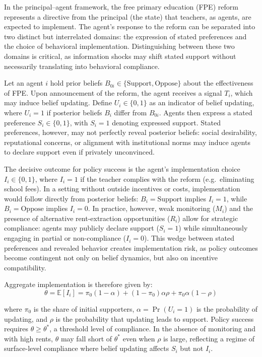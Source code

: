 \documentclass[hidelinks,12pt]{article}
\begin{document}
\begin{singlespace}
In the principal--agent framework, the free primary education (FPE) reform represents a directive from the principal (the state) that teachers, as agents, are expected to implement. The agent’s response to the reform can be separated into two distinct but interrelated domains: the expression of stated preferences and the choice of behavioral implementation. Distinguishing between these two domains is critical, as information shocks may shift stated support without necessarily translating into behavioral compliance.

Let an agent $i$ hold prior beliefs $B_{0i}\in\{\text{Support},\text{Oppose}\}$ about the effectiveness of FPE. Upon announcement of the reform, the agent receives a signal $T_i$, which may induce belief updating. Define $U_i\in\{0,1\}$ as an indicator of belief updating, where $U_i=1$ if posterior beliefs $B_i$ differ from $B_{0i}$. Agents then express a stated preference $S_i\in\{0,1\}$, with $S_i=1$ denoting expressed support. Stated preferences, however, may not perfectly reveal posterior beliefs: social desirability, reputational concerns, or alignment with institutional norms may induce agents to declare support even if privately unconvinced.

The decisive outcome for policy success is the agent’s implementation choice $I_i\in\{0,1\}$, where $I_i=1$ if the teacher complies with the reform (e.g.\ eliminating school fees). In a setting without outside incentives or costs, implementation would follow directly from posterior beliefs: $B_i=\text{Support}$ implies $I_i=1$, while $B_i=\text{Oppose}$ implies $I_i=0$. In practice, however, weak monitoring ($M_i$) and the presence of alternative rent-extraction opportunities ($R_i$) allow for strategic compliance: agents may publicly declare support ($S_i=1$) while simultaneously engaging in partial or non-compliance ($I_i=0$). This wedge between stated preferences and revealed behavior creates implementation risk, as policy outcomes become contingent not only on belief dynamics, but also on incentive compatibility.

Aggregate implementation is therefore given by:
\begin{equation} 
\theta = \mathbb{E}[I_i] = \pi_0 (1-\alpha) + (1-\pi_0)\alpha\rho + \pi_0 \alpha(1-\rho)
\end{equation} 

where $\pi_0$ is the share of initial supporters, $\alpha = \Pr(U_i=1)$ is the probability of updating, and $\rho$ is the probability that updating leads to support. Policy success requires $\theta \geq \theta^*$, a threshold level of compliance. In the absence of monitoring and with high rents, $\theta$ may fall short of $\theta^*$ even when $\rho$ is large, reflecting a regime of surface-level compliance where belief updating affects $S_i$ but not $I_i$.


\end{singlespace}
\end{document}
